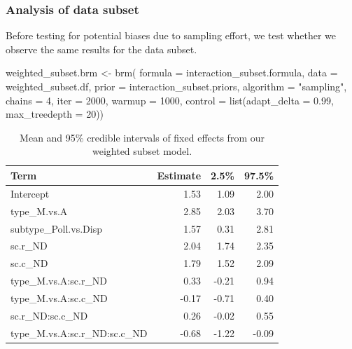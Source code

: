 \documentclass[11pt,]{article}
\newenvironment{Shaded}{}{}
\newcommand{\KeywordTok}[1]{\textcolor[rgb]{0.00,0.00,1.00}{#1}}
\newcommand{\DataTypeTok}[1]{#1}
\newcommand{\DecValTok}[1]{#1}
\newcommand{\FloatTok}[1]{#1}
\newcommand{\StringTok}[1]{\textcolor[rgb]{0.00,0.50,0.50}{#1}}
\newcommand{\NormalTok}[1]{#1}
\begin{document}
\subsubsection{Analysis of data subset}\label{analysis-of-data-subset}

Before testing for potential biases due to sampling effort, we test
whether we observe the same results for the data subset.

\begin{Shaded}
\begin{Highlighting}[]
\NormalTok{weighted_subset.brm <-}\StringTok{ }\KeywordTok{brm}\NormalTok{(}
  \DataTypeTok{formula =}\NormalTok{ interaction_subset.formula, }\DataTypeTok{data =}\NormalTok{ weighted_subset.df, }
  \DataTypeTok{prior =}\NormalTok{ interaction_subset.priors, }\DataTypeTok{algorithm =} \StringTok{"sampling"}\NormalTok{, }
  \DataTypeTok{chains =} \DecValTok{4}\NormalTok{, }\DataTypeTok{iter =} \DecValTok{2000}\NormalTok{, }\DataTypeTok{warmup =} \DecValTok{1000}\NormalTok{,}
  \DataTypeTok{control =} \KeywordTok{list}\NormalTok{(}\DataTypeTok{adapt_delta =} \FloatTok{0.99}\NormalTok{, }\DataTypeTok{max_treedepth =} \DecValTok{20}\NormalTok{))}
\end{Highlighting}
\end{Shaded}

\begin{table}[!h]

\caption{\label{tab:weighted-table}Mean and 95\% credible intervals of fixed effects from our weighted subset model.}
\centering
\begin{tabular}{lrrr}
\toprule
Term & Estimate & 2.5\% & 97.5\%\\
\midrule
\rowcolor{gray!6}  Intercept & 1.53 & 1.09 & 2.00\\
type\_M.vs.A & 2.85 & 2.03 & 3.70\\
\rowcolor{gray!6}  subtype\_Poll.vs.Disp & 1.57 & 0.31 & 2.81\\
sc.r\_ND & 2.04 & 1.74 & 2.35\\
\rowcolor{gray!6}  sc.c\_ND & 1.79 & 1.52 & 2.09\\
\addlinespace
type\_M.vs.A:sc.r\_ND & 0.33 & -0.21 & 0.94\\
\rowcolor{gray!6}  type\_M.vs.A:sc.c\_ND & -0.17 & -0.71 & 0.40\\
sc.r\_ND:sc.c\_ND & 0.26 & -0.02 & 0.55\\
\rowcolor{gray!6}  type\_M.vs.A:sc.r\_ND:sc.c\_ND & -0.68 & -1.22 & -0.09\\
\bottomrule
\end{tabular}
\end{table}
\end{document}
